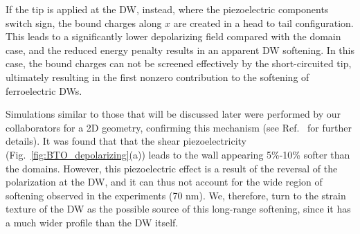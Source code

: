 If the tip is applied at the \gls{DW}, instead, where the piezoelectric components switch sign, the bound charges along $x$ are created in a head to tail configuration.
This leads to a significantly lower depolarizing field compared with the domain case, and the reduced energy penalty results in an apparent \gls{DW} softening.
In this case, the bound charges can not be screened effectively by the short-circuited tip, ultimately resulting in the first nonzero contribution to the softening of ferroelectric \glspl{DW}. 

Simulations similar to those that will be discussed later were performed by our collaborators for a 2D geometry, confirming this mechanism (see Ref.~\cite{Stefani2020} for further details).
It was found that that the shear piezoelectricity (Fig.~\ref{fig:BTO_depolarizing}(a)) leads to the wall appearing 5\%-10\% softer than the domains.
However, this piezoelectric effect is a result of the reversal of the polarization at the \gls{DW}, and it can thus not account for the wide region of softening observed in the experiments (70 nm).
We, therefore, turn to the strain texture of the \gls{DW} as the possible source of this long-range softening, since it has a much wider profile than the \gls{DW} itself.

